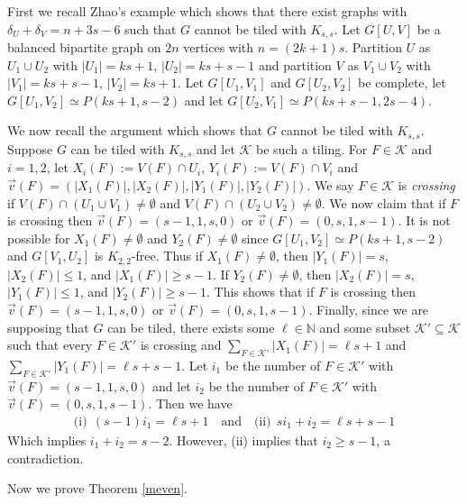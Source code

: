 \documentclass[oneside,12pt]{memoir}
\begin{document}
First we recall Zhao's example which shows that there exist graphs with $\delta_U+\delta_V=n+3s-6$ such that $G$ cannot be tiled with $K_{s,s}$.  Let $G[U, V]$ be a balanced bipartite graph on $2n$ vertices with $n=(2k+1)s$.  Partition $U$ as $U_1\cup U_2$ with $|U_1|=ks+1$, $|U_2|=ks+s-1$ and partition $V$ as $V_1\cup V_2$ with $|V_1|=ks+s-1$, $|V_2|=ks+1$.  Let $G[U_1, V_1]$ and $G[U_2, V_2]$ be complete, let $G[U_1, V_2]\simeq P(ks+1, s-2)$ and let $G[U_2, V_1]\simeq P(ks+s-1, 2s-4)$.


We now recall the argument which shows that $G$ cannot be tiled with $K_{s,s}$.  Suppose $G$ can be tiled with $K_{s,s}$ and let $\mathcal{K}$ be such a tiling.  For $F\in \mathcal{K}$ and $i=1,2$, let $X_i(F):=V(F)\cap U_i$, $Y_i(F):=V(F)\cap V_i$ and $\vec{v}(F)=(|X_1(F)|, |X_2(F)|, |Y_1(F)|, |Y_2(F)|)$.  We say $F\in \mathcal{K}$ is \emph{crossing} if $V(F)\cap (U_1\cup V_1)\neq \emptyset$ and $V(F)\cap (U_2\cup V_2)\neq \emptyset$.  We now claim that if $F$ is crossing then $\vec{v}(F)=(s-1,1,s,0)$ or $\vec{v}(F)=(0,s,1,s-1)$.  It is not possible for $X_1(F)\neq \emptyset$ and $Y_2(F)\neq \emptyset$ since $G[U_1, V_2]\simeq P(ks+1, s-2)$ and $G[V_1, U_2]$ is $K_{2,2}$-free.  Thus if $X_1(F)\neq \emptyset$, then $|Y_1(F)|=s$, $|X_2(F)|\leq 1$, and $|X_1(F)|\geq s-1$.  If $Y_2(F)\neq \emptyset$, then $|X_2(F)|=s$, $|Y_1(F)|\leq 1$, and $|Y_2(F)|\geq s-1$.  This shows that if $F$ is crossing then $\vec{v}(F)=(s-1,1,s,0)$ or $\vec{v}(F)=(0,s,1,s-1)$.  Finally, since we are supposing that $G$ can be tiled, there exists some $\ell\in \mathbb{N}$ and some subset $\mathcal{K}'\subseteq \mathcal{K}$ such that every $F\in \mathcal{K}'$ is crossing and $\sum_{F\in \mathcal{K}'}|X_1(F)|=\ell s+1$ and $\sum_{F\in \mathcal{K}'}|Y_1(F)|=\ell s+s-1$.  Let $i_1$ be the number of $F\in \mathcal{K}'$ with $\vec{v}(F)=(s-1,1,s,0)$ and let $i_2$ be the number of $F\in \mathcal{K}'$ with $\vec{v}(F)=(0,s,1,s-1)$.  Then we have
\begin{align*}
\text{(i)} ~~(s-1)i_1=\ell s+1 ~~~\text{ and }~~~ \text{(ii)} ~~si_1+i_2=\ell s+s-1
\end{align*}
Which implies $i_1+i_2=s-2$.  However, (ii) implies that $i_2\geq s-1$, a contradiction.

Now we prove Theorem \ref{meven}.
\end{document}
